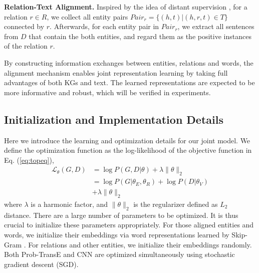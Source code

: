 \documentclass[11pt,a4paper]{article}
\begin{document}

\textbf{Relation-Text Alignment.} Inspired by the idea of distant supervision \cite{min2013distant}, for a relation $r \in R$, we collect all entity pairs $Pair_{r} = \{(h, t) | (h, r, t) \in T \}$ connected by $r$. Afterwards, for each entity pair in $Pair_{r}$, we extract all sentences from $D$ that contain the both entities, and regard them as the positive instances of the relation $r$. %

By constructing information exchanges between entities, relations and words, the alignment mechanism enables joint representation learning by taking full advantages of both KGs and text. The learned representations are expected to be more informative and robust, which will be verified in experiments.


\subsection{Initialization and Implementation Details}
\label{sec:detail}
Here we introduce the learning and optimization details for our joint model. We define the optimization function as the log-likelihood of the objective function in Eq. (\ref{eq:topeq}),
\begin{align}
\mathcal{L}_{\theta}(G, D) & = \log P(G,D|{\theta}) + \lambda \lVert \theta \rVert_2 \\\nonumber
 & = \log P(G|{\theta_E, \theta_R}) + \log P(D|{\theta_V}) \\\nonumber
 & + \lambda \lVert \theta \rVert_2
\end{align}
where $\lambda$ is a harmonic factor, and $\lVert \theta \rVert_2$ is the regularizer defined as $L_2$ distance. There are a large number of parameters to be optimized. It is thus crucial to initialize these parameters appropriately. For those aligned entities and words, we initialize their embeddings via word representations learned by Skip-Gram \cite{mikolov2013efficient}. For relations and other entities, we initialize their embeddings randomly. Both Prob-TransE and CNN are optimized simultaneously using stochastic gradient descent (SGD). 
\end{document}

